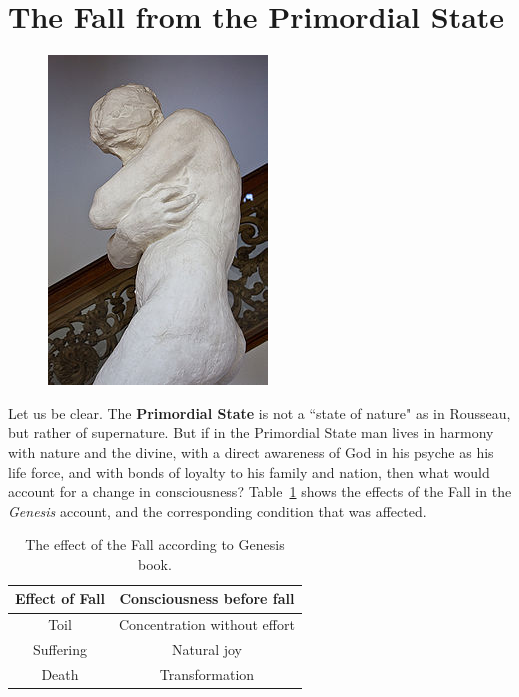 \section{The Fall from the Primordial State}

\begin{figure}
 \includegraphics[scale=1.5]{a20110111TheFallfromthePrimordialState-img001.jpg}
\end{figure}

Let us be clear. The \textbf{Primordial State} is not a ``state of nature" as in Rousseau, but rather of supernature. But if in the Primordial State man lives in harmony with nature and the divine, with a direct awareness of God in his psyche as his life force, and with bonds of loyalty to his family and nation, then what would account for a change in consciousness? Table~\ref{tab:FallPrimordialState1} shows the effects of the Fall in the \emph{Genesis} account, and the corresponding condition that was affected.

\begin{table}[h]
\centering\small
\begin{tabular}{cc}\toprule
\textbf{Effect of Fall} &
\textbf{Consciousness before fall}\\\toprule
Toil &
Concentration without effort\\\midrule
Suffering &
Natural joy\\\midrule
Death &
Transformation\\\bottomrule
\end{tabular}
\caption{The effect of the Fall according to Genesis book.}
\label{tab:FallPrimordialState1}
\end{table}

